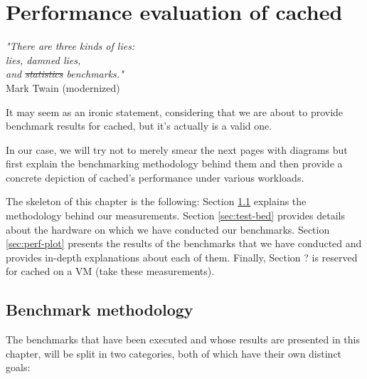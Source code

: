 \chapter{Performance evaluation of cached}\label{ch:cached-evaluation}

\begin{flushright}
	\textit{"There are three kinds of lies:\\
		lies, damned lies, \\
		and \sout{statistics} benchmarks."}	\\

	Mark Twain (modernized)
\end{flushright}

It may seem as an ironic statement, considering that we are about to provide 
benchmark results for cached, but it's actually is a valid one.
\begin{comment}
What Mr.  Twain tries to say here
\footnote{
	and that's a phrase usually not heard in programming contexts...
}
is that the presentation of partials facts for something can be used to 
fabricate a plausible truth for it.
In science's case, it so often happens that promising results for an experiment 
can seem more important to the researcher's eye than negative ones due to 
positive reinforcement.
\end{comment}
In our case, we will try not to merely smear the next pages with diagrams but 
first explain the benchmarking methodology behind them and then provide a 
concrete depiction of cached's performance under various workloads.

The skeleton of this chapter is the following: Section \ref{sec:perf-meth} 
explains the methodology behind our measurements. Section \ref{sec:test-bed} 
provides details about the hardware on which we have conducted our benchmarks.  
Section \ref{sec:perf-plot} presents the results of the benchmarks that we have 
conducted and provides in-depth explanations about each of them.  Finally, 
Section ?  is reserved for cached on a VM (\fixme take these measurements).

\section{Benchmark methodology}\label{sec:perf-meth}

The benchmarks that have been executed and whose results are presented in this 
chapter, will be split in two categories, both of which have their own distinct 
goals:

